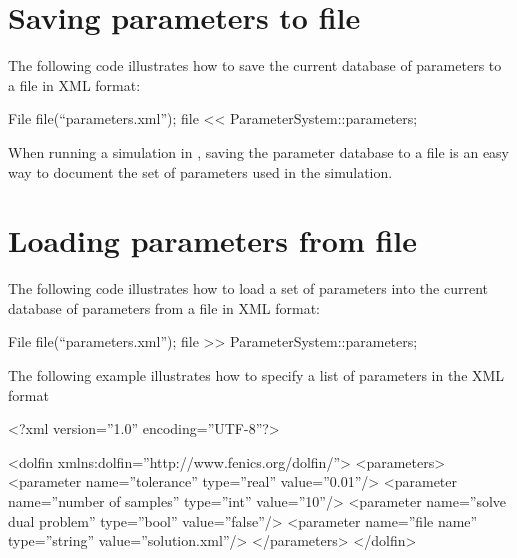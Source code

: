 \section{Saving parameters to file}

The following code illustrates how to save the current database of
parameters to a file in \dolfin{} XML format:
\begin{code}
  File file(``parameters.xml'');
  file << ParameterSystem::parameters;
\end{code}
When running a simulation in \dolfin{}, saving the parameter database
to a file is an easy way to document the set of parameters used in the
simulation.

\section{Loading parameters from file}

The following code illustrates how to load a set of parameters into
the current database of parameters from a file in \dolfin{} XML format:
\begin{code}
  File file(``parameters.xml'');
  file >> ParameterSystem::parameters;
\end{code}
The following example illustrates how to specify a list of parameters
in the \dolfin{} XML format
\footnotesize
\begin{code}
<?xml version=''1.0'' encoding=''UTF-8''?> 

<dolfin xmlns:dolfin=''http://www.fenics.org/dolfin/''> 
  <parameters>
    <parameter name=''tolerance'' type=''real'' value=''0.01''/>
    <parameter name=''number of samples'' type=''int'' value=''10''/>
    <parameter name=''solve dual problem'' type=''bool'' value=''false''/>
    <parameter name=''file name'' type=''string'' value=''solution.xml''/>
  </parameters>
</dolfin>
\end{code}
\normalsize
